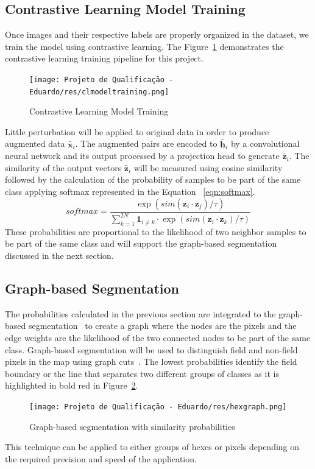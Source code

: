 \documentclass[12pt]{article}
\begin{document}
{\subsection{Contrastive Learning Model Training}\label{subsection:cltraining}
Once images and their respective labels are properly organized in the dataset, we train the model using contrastive learning. The Figure~\ref{figure:contrastive_training} demonstrates the contrastive learning training pipeline for this project.
\begin{figure}[ht]
\centering
\texttt{[image: Projeto de Qualificação - Eduardo/res/clmodeltraining.png]}
\caption{\label{figure:contrastive_training}Contrastive Learning Model Training}
\end{figure}
Little perturbation will be applied to original data in order to produce augmented data $\tilde{\boldsymbol{x}_i}$. The augmented pairs are encoded to $\tilde{\boldsymbol{h}_i}$ by a convolutional neural network and its output processed by a projection head to generate $\tilde{\boldsymbol{z}_i}$.  The similarity of the output vectors $\tilde{\boldsymbol{z}_i}$ will be measured using cosine similarity followed by the calculation of the probability of samples to be part of the same class applying softmax represented in the Equation ~\ref{eqn:softmax}.
\begin{equation}
softmax=\frac{\exp{\left(sim(\boldsymbol{z}_i\cdot\boldsymbol{z}_j)/\tau\right)}}{\sum_{k=1}^{2N}\mathbf{1}_{i\neq k}\cdot\exp{\left(sim(\boldsymbol{z}_i\cdot\boldsymbol{z}_k)/\tau\right)}}
\label{eqn:softmax}
\end{equation}
These probabilities are proportional to the likelihood of two neighbor samples to be part of the same class and will support the graph-based segmentation discussed in the next section.
\subsection{Graph-based Segmentation}\label{subsection:graphbasedsegmentation}
The probabilities calculated in the previous section are integrated to the graph-based segmentation~\citep{felzenszwalb2004} to create a graph where the nodes are the pixels and the edge weights are the likelihood of the two connected nodes to be part of the same class. Graph-based segmentation will be used to distinguish field and non-field pixels in the map using graph cuts~\citep{veksler2001}. The lowest probabilities identify the field boundary or the line that separates two different groups of classes
as it is highlighted in bold red in Figure~\ref{figure:hexgraph}.
\begin{figure}[ht]
\centering
\texttt{[image: Projeto de Qualificação - Eduardo/res/hexgraph.png]}
\caption{\label{figure:hexgraph}Graph-based segmentation with similarity probabilities\protect}
\end{figure}
This technique can be applied to either groups of hexes or pixels depending on the required precision and speed of the application.
}
\end{document}

